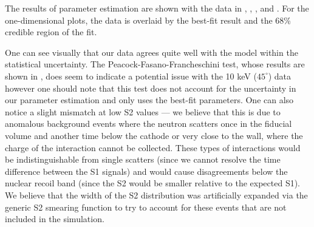 The results of parameter estimation are shown with the data in , , , and .  For the one-dimensional plots, the data is overlaid by the best-fit result and the 68\% credible region of the fit.  %



One can see visually that our data agrees quite well with the model within the statistical uncertainty.  The Peacock-Fasano-Francheschini test, whose results are shown in , does seem to indicate a potential issue with the 10 keV ($45^{\circ}$) data however one should note that this test does not account for the uncertainty in our parameter estimation and only uses the best-fit parameters.  One can also notice a slight mismatch at low S2 values --- we believe that this is due to anomalous background events where the neutron scatters once in the fiducial volume and another time below the cathode or very close to the wall, where the charge of the interaction cannot be collected.  These types of interactions would be indistinguishable from single scatters (since we cannot resolve the time difference between the S1 signals) and would cause disagreements below the nuclear recoil band (since the S2 would be smaller relative to the expected S1).  We believe that the width of the S2 distribution was artificially expanded via the generic S2 smearing function to try to account for these events that are not included in the simulation.






